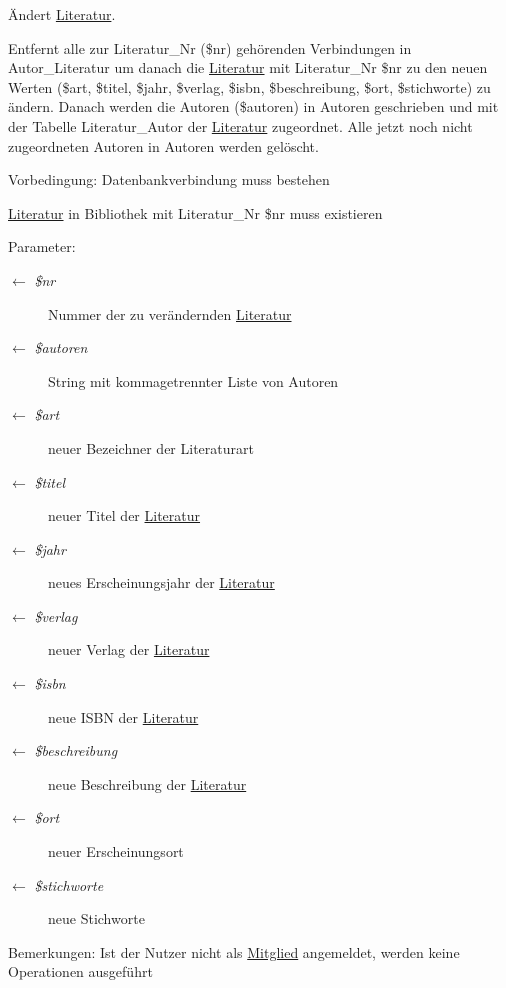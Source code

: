 Ändert \hyperlink{classLiteratur}{Literatur}. 

Entfernt alle zur Literatur\_\-Nr (\$nr) gehörenden Verbindungen in Autor\_\-Literatur um danach die \hyperlink{classLiteratur}{Literatur} mit Literatur\_\-Nr \$nr zu den neuen Werten (\$art, \$titel, \$jahr, \$verlag, \$isbn, \$beschreibung, \$ort, \$stichworte) zu ändern. Danach werden die Autoren (\$autoren) in Autoren geschrieben und mit der Tabelle Literatur\_\-Autor der \hyperlink{classLiteratur}{Literatur} zugeordnet. Alle jetzt noch nicht zugeordneten Autoren in Autoren werden gelöscht. \begin{Desc}
\item[Vorbedingung:]Datenbankverbindung muss bestehen 

\hyperlink{classLiteratur}{Literatur} in Bibliothek mit Literatur\_\-Nr \$nr muss existieren \end{Desc}
\begin{Desc}
\item[Parameter:]
\begin{description}
\item[\mbox{$\leftarrow$} {\em \$nr}]Nummer der zu verändernden \hyperlink{classLiteratur}{Literatur} \item[\mbox{$\leftarrow$} {\em \$autoren}]String mit kommagetrennter Liste von Autoren \item[\mbox{$\leftarrow$} {\em \$art}]neuer Bezeichner der Literaturart \item[\mbox{$\leftarrow$} {\em \$titel}]neuer Titel der \hyperlink{classLiteratur}{Literatur} \item[\mbox{$\leftarrow$} {\em \$jahr}]neues Erscheinungsjahr der \hyperlink{classLiteratur}{Literatur} \item[\mbox{$\leftarrow$} {\em \$verlag}]neuer Verlag der \hyperlink{classLiteratur}{Literatur} \item[\mbox{$\leftarrow$} {\em \$isbn}]neue ISBN der \hyperlink{classLiteratur}{Literatur} \item[\mbox{$\leftarrow$} {\em \$beschreibung}]neue Beschreibung der \hyperlink{classLiteratur}{Literatur} \item[\mbox{$\leftarrow$} {\em \$ort}]neuer Erscheinungsort \item[\mbox{$\leftarrow$} {\em \$stichworte}]neue Stichworte \end{description}
\end{Desc}
\begin{Desc}
\item[Bemerkungen:]Ist der Nutzer nicht als \hyperlink{classMitglied}{Mitglied} angemeldet, werden keine Operationen ausgeführt \end{Desc}



